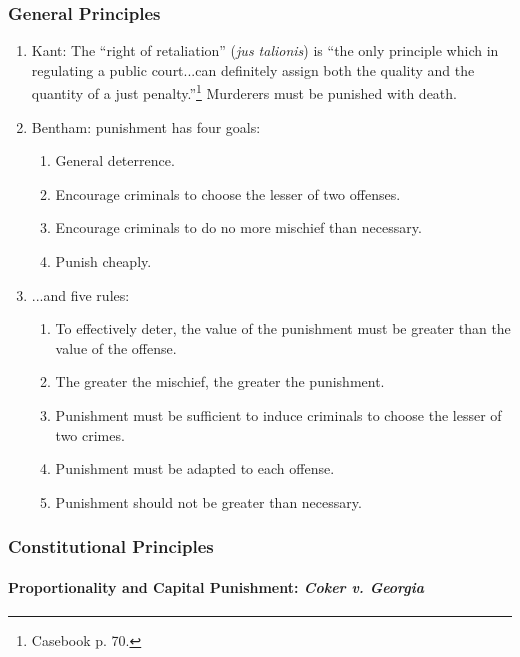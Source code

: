 \subsubsection{General Principles}

\begin{enumerate}
    \item Kant: The ``right of retaliation'' (\emph{jus talionis}) is ``the only principle which in regulating a public court...can definitely assign both the quality and the quantity of a just penalty.''\footnote{Casebook p. 70.} Murderers must be punished with death.
    \item Bentham: punishment has four goals:
    \begin{enumerate}
        \item General deterrence.
        \item Encourage criminals to choose the lesser of two offenses.
        \item Encourage criminals to do no more mischief than necessary.
        \item Punish cheaply.
    \end{enumerate}
    \item ...and five rules:
    \begin{enumerate}
        \item To effectively deter, the value of the punishment must be greater than the value of the offense.
        \item The greater the mischief, the greater the punishment.
        \item Punishment must be sufficient to induce criminals to choose the lesser of two crimes.
        \item Punishment must be adapted to each offense.
        \item Punishment should not be greater than necessary.
    \end{enumerate}
\end{enumerate}

\subsubsection{Constitutional Principles}

\paragraph{Proportionality and Capital Punishment: \emph{Coker v. Georgia}}

